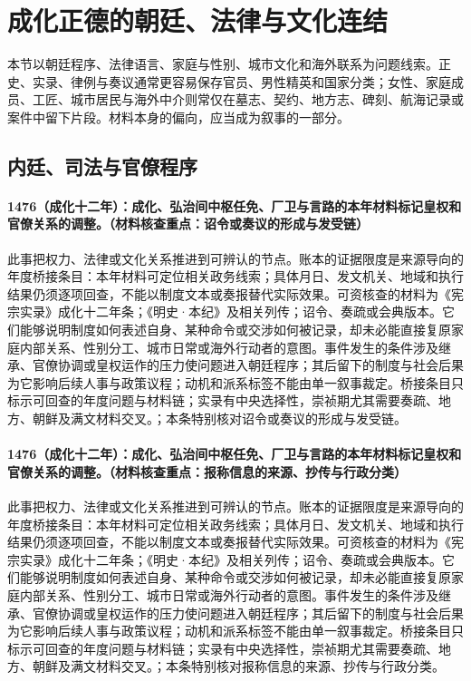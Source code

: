 \section{成化正德的朝廷、法律与文化连结}

本节以朝廷程序、法律语言、家庭与性别、城市文化和海外联系为问题线索。正史、实录、律例与奏议通常更容易保存官员、男性精英和国家分类；女性、家庭成员、工匠、城市居民与海外中介则常仅在墓志、契约、地方志、碑刻、航海记录或案件中留下片段。材料本身的偏向，应当成为叙事的一部分。

\subsection{内廷、司法与官僚程序}

\paragraph{1476（成化十二年）：成化、弘治间中枢任免、厂卫与言路的本年材料标记皇权和官僚关系的调整。（材料核查重点：诏令或奏议的形成与发受链）} 此事把权力、法律或文化关系推进到可辨认的节点。账本的证据限度是来源导向的年度桥接条目：本年材料可定位相关政务线索；具体月日、发文机关、地域和执行结果仍须逐项回查，不能以制度文本或奏报替代实际效果。可资核查的材料为《宪宗实录》成化十二年条；《明史·本纪》及相关列传；诏令、奏疏或会典版本。它们能够说明制度如何表述自身、某种命令或交涉如何被记录，却未必能直接复原家庭内部关系、性别分工、城市日常或海外行动者的意图。事件发生的条件涉及继承、官僚协调或皇权运作的压力使问题进入朝廷程序；其后留下的制度与社会后果为它影响后续人事与政策议程；动机和派系标签不能由单一叙事裁定。桥接条目只标示可回查的年度问题与材料链；实录有中央选择性，崇祯期尤其需要奏疏、地方、朝鲜及满文材料交叉。；本条特别核对诏令或奏议的形成与发受链。

\paragraph{1476（成化十二年）：成化、弘治间中枢任免、厂卫与言路的本年材料标记皇权和官僚关系的调整。（材料核查重点：报称信息的来源、抄传与行政分类）} 此事把权力、法律或文化关系推进到可辨认的节点。账本的证据限度是来源导向的年度桥接条目：本年材料可定位相关政务线索；具体月日、发文机关、地域和执行结果仍须逐项回查，不能以制度文本或奏报替代实际效果。可资核查的材料为《宪宗实录》成化十二年条；《明史·本纪》及相关列传；诏令、奏疏或会典版本。它们能够说明制度如何表述自身、某种命令或交涉如何被记录，却未必能直接复原家庭内部关系、性别分工、城市日常或海外行动者的意图。事件发生的条件涉及继承、官僚协调或皇权运作的压力使问题进入朝廷程序；其后留下的制度与社会后果为它影响后续人事与政策议程；动机和派系标签不能由单一叙事裁定。桥接条目只标示可回查的年度问题与材料链；实录有中央选择性，崇祯期尤其需要奏疏、地方、朝鲜及满文材料交叉。；本条特别核对报称信息的来源、抄传与行政分类。

